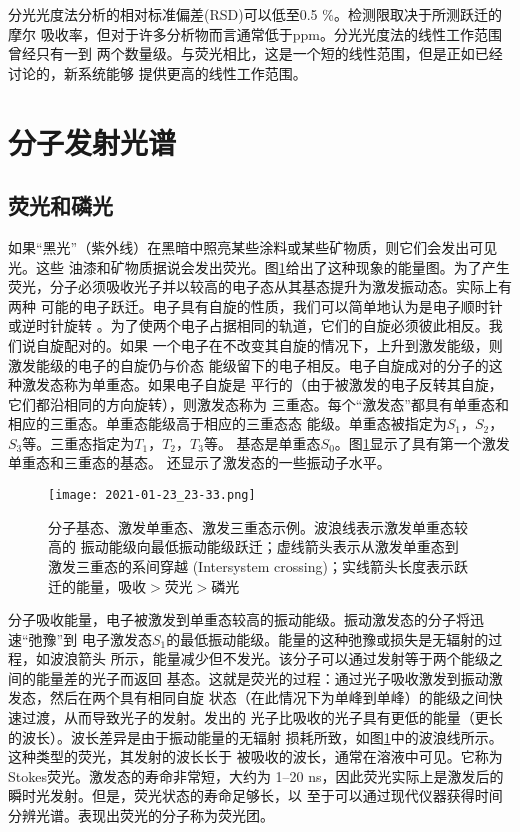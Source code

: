 分光光度法分析的相对标准偏差(RSD)可以低至0.5 \%。检测限取决于所测跃迁的摩尔
吸收率，但对于许多分析物而言通常低于ppm。分光光度法的线性工作范围曾经只有一到
两个数量级。与荧光相比，这是一个短的线性范围，但是正如已经讨论的，新系统能够
提供更高的线性工作范围。
\section{分子发射光谱}
\subsection{荧光和磷光}
如果“黑光”（紫外线）在黑暗中照亮某些涂料或某些矿物质，则它们会发出可见光。这些
油漆和矿物质据说会发出荧光。图\ref{fig:5.49}给出了这种现象的能量图。为了产生
荧光，分子必须吸收光子并以较高的电子态从其基态提升为激发振动态。实际上有两种
可能的电子跃迁。电子具有自旋的性质，我们可以简单地认为是电子顺时针或逆时针旋转
。为了使两个电子占据相同的轨道，它们的自旋必须彼此相反。我们说自旋配对的。如果
一个电子在不改变其自旋的情况下，上升到激发能级，则激发能级的电子的自旋仍与价态
能级留下的电子相反。电子自旋成对的分子的这种激发态称为单重态。如果电子自旋是
平行的（由于被激发的电子反转其自旋，它们都沿相同的方向旋转），则激发态称为
三重态。每个“激发态”都具有单重态和相应的三重态。单重态能级高于相应的三重态态
能级。单重态被指定为$S_1$，$S_2$，$S_3$等。三重态指定为$T_1$，$T_2$，$T_3$等。
基态是单重态$S_0$。图\ref{fig:5.49}显示了具有第一个激发单重态和三重态的基态。
还显示了激发态的一些振动子水平。
\begin{figure}[htpb]
    \centering
    \texttt{[image: 2021-01-23\_23-33.png]}
    \caption{分子基态、激发单重态、激发三重态示例。波浪线表示激发单重态较高的
    振动能级向最低振动能级跃迁；虚线箭头表示从激发单重态到激发三重态的系间穿越
    (Intersystem crossing)；实线箭头长度表示跃迁的能量，吸收$>$荧光$>$磷光}
    \label{fig:5.49}
\end{figure}

分子吸收能量，电子被激发到单重态较高的振动能级。振动激发态的分子将迅速“弛豫”到
电子激发态$S_1$的最低振动能级。能量的这种弛豫或损失是无辐射的过程，如波浪箭头
所示，能量减少但不发光。该分子可以通过发射等于两个能级之间的能量差的光子而返回
基态。这就是荧光的过程：通过光子吸收激发到振动激发态，然后在两个具有相同自旋
状态（在此情况下为单峰到单峰）的能级之间快速过渡，从而导致光子的发射。发出的
光子比吸收的光子具有更低的能量（更长的波长）。波长差异是由于振动能量的无辐射
损耗所致，如图\ref{fig:5.49}中的波浪线所示。这种类型的荧光，其发射的波长长于
被吸收的波长，通常在溶液中可见。它称为Stokes荧光。激发态的寿命非常短，大约为
1--20 ns，因此荧光实际上是激发后的瞬时光发射。但是，荧光状态的寿命足够长，以
至于可以通过现代仪器获得时间分辨光谱。表现出荧光的分子称为荧光团。

